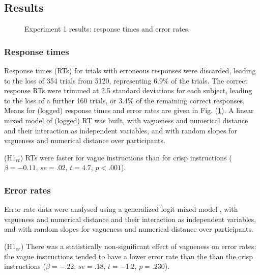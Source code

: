 \documentclass[%
man,		%
floatsintext,%
apacite%
]{apa6}
\begin{document}
\subsection{Results}

%
\begin{figure}[htbp]
\caption{Experiment 1 results: response times and error rates.}
\label{resultse1}
\end{figure}

\subsubsection{Response times}
Response times (RTs) for trials with erroneous responses were discarded, leading to the loss of 354 trials from 5120, representing 6.9\% of the trials. 
The correct response RTs were trimmed at 2.5 standard deviations for each subject, leading to the loss of a further 160 trials, or 3.4\% of the remaining correct responses. 
Means for (logged) response times and error rates are given in Fig. (\ref{resultse1}).
A linear mixed model of (logged) RT was built, with vagueness and numerical distance and their interaction as independent variables, and with random slopes for vagueness and numerical distance over participants.

\begin{APAenumerate}
	\item [(H1$_{rt}$)] RTs were faster for vague instructions than for crisp instructions 
	($\beta=-0.11$, $se=.02$, $t=4.7$, $p<.001$).  %
\end{APAenumerate}

\subsubsection{Error rates}
Error rate data were analysed using a generalized logit mixed model \cite{jaeger2008categorical}, with vagueness and numerical distance and their interaction as independent variables, and with random slopes for vagueness and numerical distance over participants. 

\begin{APAenumerate}
	\item [(H1$_{er}$)] There was a statistically non-significant effect of vagueness on error rates: the vague instructions tended to have a lower error rate than the than the crisp instructions 
	($\beta=-.22$, $se=.18$, $t=-1.2$, $p=.230$).  %
\end{APAenumerate}
\end{document}
